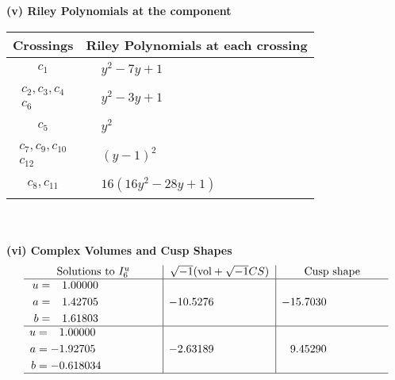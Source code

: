 \documentclass[1p]{elsarticle_modified}
\theoremstyle{definition}
\newcommand{\I}{\sqrt{-1}}
\begin{document}
\newpage\renewcommand{\arraystretch}{1}
\flushleft \textbf{(v) Riley Polynomials at the component}\newline \\
\begin{tabular}{m{50pt}|m{274pt}}
Crossings & \hspace{64pt}Riley Polynomials at each crossing \\
\hline $$\begin{aligned}c_{1}\end{aligned}$$&$\begin{aligned}
&y^2-7 y+1
\end{aligned}$\\
\hline $$\begin{aligned}c_{2},c_{3},c_{4}\\c_{6}\end{aligned}$$&$\begin{aligned}
&y^2-3 y+1
\end{aligned}$\\
\hline $$\begin{aligned}c_{5}\end{aligned}$$&$\begin{aligned}
&y^2
\end{aligned}$\\
\hline $$\begin{aligned}c_{7},c_{9},c_{10}\\c_{12}\end{aligned}$$&$\begin{aligned}
&(y-1)^2
\end{aligned}$\\
\hline $$\begin{aligned}c_{8},c_{11}\end{aligned}$$&$\begin{aligned}
&16(16 y^2-28 y+1)
\end{aligned}$\\
\hline
\end{tabular}\\~\\
\newpage\flushleft \textbf{(vi) Complex Volumes and Cusp Shapes}
$$\begin{array}{c|c|c}  
\text{Solutions to }I^u_{6}& \I (\text{vol} + \sqrt{-1}CS) & \text{Cusp shape}\\
 \hline 
\begin{aligned}
u &= \phantom{-}1.00000\phantom{ +0.000000I} \\
a &= \phantom{-}1.42705\phantom{ +0.000000I} \\
b &= \phantom{-}1.61803\phantom{ +0.000000I}\end{aligned}
 & -10.5276\phantom{ +0.000000I} & -15.7030\phantom{ +0.000000I} \\ \hline\begin{aligned}
u &= \phantom{-}1.00000\phantom{ +0.000000I} \\
a &= -1.92705\phantom{ +0.000000I} \\
b &= -0.618034\phantom{ +0.000000I}\end{aligned}
 & -2.63189\phantom{ +0.000000I} & \phantom{-}9.45290\phantom{ +0.000000I}\\
 \hline 
 \end{array}$$\newpage
\end{document}
